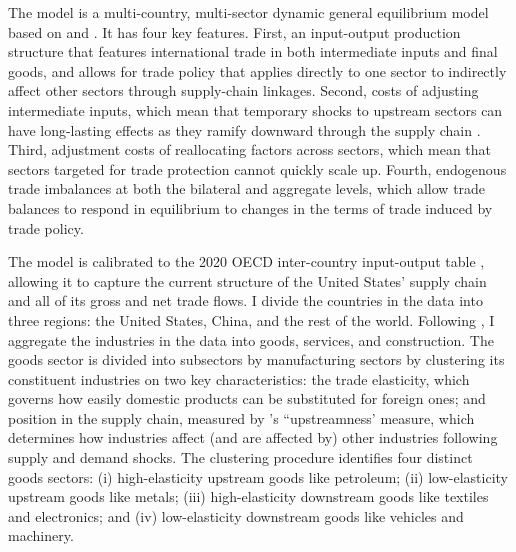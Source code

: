 \documentclass[12pt]{article}
\begin{document}
The model is a multi-country, multi-sector dynamic general equilibrium model based on \citet{KRS_2018} and \citet{cje_nafta}. It has four key features. First, an input-output production structure that features international trade in both intermediate inputs and final goods, and allows for trade policy that applies directly to one sector to indirectly affect other sectors through supply-chain linkages. Second, costs of adjusting intermediate inputs, which mean that temporary shocks to upstream sectors can have long-lasting effects as they ramify downward through the supply chain \citep{lt_restud}. Third, adjustment costs of reallocating factors across sectors, which mean that sectors targeted for trade protection cannot quickly scale up. Fourth, endogenous trade imbalances at both the bilateral and aggregate levels, which allow trade balances to respond in equilibrium to changes in the terms of trade induced by trade policy.

The model is calibrated to the 2020 OECD inter-country input-output table \citep{oecd_icio}, allowing it to capture the current structure of the United States' supply chain and all of its gross and net trade flows. I divide the countries in the data into three regions: the United States, China, and the rest of the world. Following \citet{KRS_2018}, I aggregate the industries in the data into goods, services, and construction. The goods sector is divided into subsectors by manufacturing sectors by clustering its constituent industries on two key characteristics: the trade elasticity, which governs how easily domestic products can be substituted for foreign ones; and position in the supply chain, measured by \citet{acfh_2012}'s ``upstreamness' measure, which determines how industries affect (and are affected by) other industries following supply and demand shocks. The clustering procedure identifies four distinct goods sectors: (i) high-elasticity upstream goods like petroleum; (ii) low-elasticity upstream goods like metals; (iii) high-elasticity downstream goods like textiles and electronics; and (iv) low-elasticity downstream goods like vehicles and machinery.

% 
\end{document}
